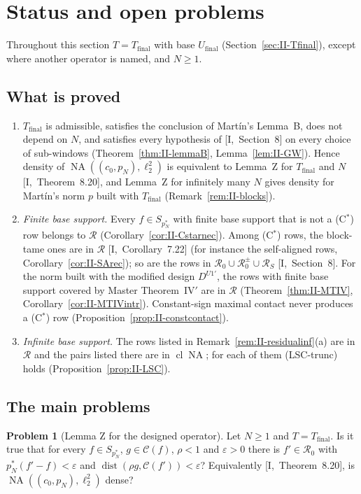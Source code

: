 \documentclass[10pt]{amsart}
\theoremstyle{definition}
\newtheorem{problem}[theorem]{Problem}
\theoremstyle{remark}
\newcommand{\NA}{\operatorname{NA}}
\newcommand{\dist}{\operatorname{dist}}
\newcommand{\Cset}{\mathcal C}
\newcommand{\cl}{\operatorname{cl}}
\newcommand{\Rec}{\mathcal R}
\begin{document}
\section{Status and open problems}\label{sec:II-status}

Throughout this section $T=T_{\mathrm{final}}$ with base $U_{\mathrm{final}}$
(Section~\ref{sec:II-Tfinal}), except where another operator is named, and
$N\ge1$.

\subsection{What is proved}
\begin{enumerate}
\item[(a)] $T_{\mathrm{final}}$ is admissible, satisfies the conclusion of
Mart\'in's Lemma~B, does not depend on $N$, and satisfies every hypothesis
of [I,~Section~8] on every choice of sub-windows
(Theorem~\ref{thm:II-lemmaB}, Lemma~\ref{lem:II-GW}).  Hence density of
$\NA((c_0,p_N),\ell_2^2)$ is equivalent to Lemma~Z for $T_{\mathrm{final}}$
and $N$ [I,~Theorem~8.20], and Lemma~Z for infinitely many $N$ gives
density for Mart\'in's norm $p$ built with $T_{\mathrm{final}}$
(Remark~\ref{rem:II-blocks}).
\item[(b)] \emph{Finite base support.}  Every $f\in S_{p_N^*}$ with finite
base support that is not a (C$^*$) row belongs to $\Rec$
(Corollary~\ref{cor:II-Cstarnec}).  Among (C$^*$) rows, the block-tame ones
are in $\Rec$ [I,~Corollary~7.22] (for instance the self-aligned rows,
Corollary~\ref{cor:II-SArec}); so are the rows in $\mathcal R_0\cup\mathcal
R_0^\pm\cup\mathcal R_S$ [I,~Section~8].  For the norm built with the
modified design $D^{U1'}$, the rows with finite base support covered by
Master Theorem~IV$'$ are in $\Rec$ (Theorem~\ref{thm:II-MTIV},
Corollary~\ref{cor:II-MTIVintr}).  Constant-sign maximal contact never
produces a (C$^*$) row (Proposition~\ref{prop:II-constcontact}).
\item[(c)] \emph{Infinite base support.}  The rows listed in
Remark~\ref{rem:II-residualinf}(a) are in $\Rec$ and the pairs listed there
are in $\cl\NA$; for each of them (LSC-trunc) holds
(Proposition~\ref{prop:II-LSC}).
\end{enumerate}

\subsection{The main problems}

\begin{problem}[Lemma Z for the designed operator]\label{prob:II-Z}
Let $N\ge1$ and $T=T_{\mathrm{final}}$.  Is it true that for every $f\in
S_{p_N^*}$, $g\in\Cset(f)$, $\rho<1$ and $\varepsilon>0$ there is
$f'\in\mathcal R_0$ with $p_N^*(f'-f)<\varepsilon$ and $\dist(\rho
g,\Cset(f'))<\varepsilon$?  Equivalently [I,~Theorem~8.20], is
$\NA((c_0,p_N),\ell_2^2)$ dense?
\end{problem}
\end{document}
